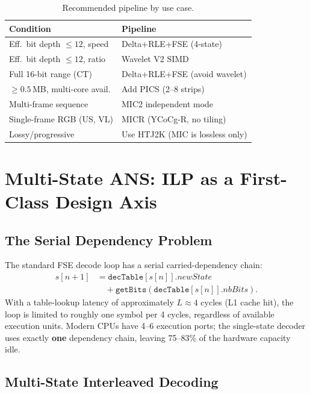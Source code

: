\documentclass[10pt,twocolumn]{article}
\begin{document}
\begin{table}[htbp]
\centering
\footnotesize
\setlength{\tabcolsep}{4pt}
\caption{Recommended pipeline by use case.}
\label{tab:selection}
\begin{tabular}{p{3.5cm}p{3.8cm}}
\toprule
Condition & Pipeline \\
\midrule
Eff.\ bit depth $\leq 12$, speed & Delta+RLE+FSE (4-state) \\
Eff.\ bit depth $\leq 12$, ratio & Wavelet V2 SIMD \\
Full 16-bit range (CT) & Delta+RLE+FSE (avoid wavelet) \\
$\geq 0.5$\,MB, multi-core avail. & Add PICS (2--8 strips) \\
Multi-frame sequence & MIC2 independent mode \\
Single-frame RGB (US, VL) & MICR (YCoCg-R, no tiling) \\
Lossy/progressive & Use HTJ2K (MIC is lossless only) \\
\bottomrule
\end{tabular}
\end{table}

\section{Multi-State ANS: ILP as a First-Class Design Axis}
\label{sec:multistate}

\subsection{The Serial Dependency Problem}

The standard FSE decode loop has a serial carried-dependency chain:
\begin{align}
  s[n{+}1] &= \texttt{decTable}[s[n]].\textit{newState} \nonumber\\
            &\quad + \texttt{getBits}\!\left(\texttt{decTable}[s[n]].\textit{nbBits}\right).
\end{align}
With a table-lookup latency of approximately $L \approx 4$ cycles (L1 cache
hit), the loop is limited to roughly one symbol per 4 cycles, regardless of
available execution units. Modern CPUs have 4--6 execution ports; the
single-state decoder uses exactly \textbf{one} dependency chain, leaving
75--83\% of the hardware capacity idle.

\subsection{Multi-State Interleaved Decoding}
\end{document}
